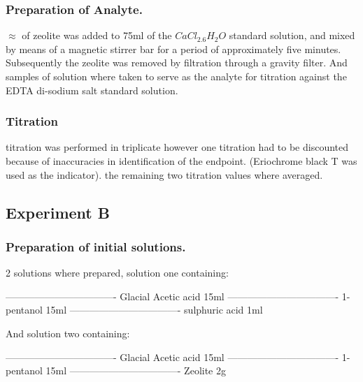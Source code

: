 \documentclass[]{article}
\begin{document}
\hypertarget{preparation-of-analyte.}{%
\subsubsection{Preparation of Analyte.}\label{preparation-of-analyte.}}

\(\approx\) of zeolite was added to 75ml of the \(CaCl_2.6H_2O\)
standard solution, and mixed by means of a magnetic stirrer bar for a
period of approximately five minutes. Subsequently the zeolite was
removed by filtration through a gravity filter. And samples of solution
where taken to serve as the analyte for titration against the EDTA
di-sodium salt standard solution.

\hypertarget{titration}{%
\subsubsection{Titration}\label{titration}}

titration was performed in triplicate however one titration had to be
discounted because of inaccuracies in identification of the endpoint.
(Eriochrome black T was used as the indicator). the remaining two
titration values where averaged.

\hypertarget{experiment-b}{%
\subsection{Experiment B}\label{experiment-b}}

\hypertarget{preparation-of-initial-solutions.}{%
\subsubsection{Preparation of initial
solutions.}\label{preparation-of-initial-solutions.}}

2 solutions where prepared, solution one containing:

\textbar{}----------------------------------\textbar{} \textbar{}
Glacial Acetic acid \textbar{} 15ml \textbar{} \textbar{}
\textbar{}----------------------------------\textbar{} \textbar{}
1-pentanol \textbar{} 15ml \textbar{} \textbar{}
\textbar{}----------------------------------\textbar{} \textbar{}
sulphuric acid \textbar{} 1ml \textbar{} \textbar{}

And solution two containing:

\textbar{}----------------------------------\textbar{} \textbar{}
Glacial Acetic acid \textbar{} 15ml \textbar{} \textbar{}
\textbar{}----------------------------------\textbar{} \textbar{}
1-pentanol \textbar{} 15ml \textbar{} \textbar{}
\textbar{}----------------------------------\textbar{} \textbar{}
Zeolite \textbar{} 2g \textbar{} \textbar{}
\end{document}
